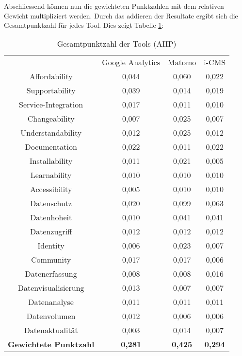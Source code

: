       \newpage
      Abschliessend können nun die gewichteten Punktzahlen mit dem relativen Gewicht multipliziert werden. Durch das addieren der Resultate ergibt sich die Gesamtpunktzahl für jedes Tool. Dies zeigt Tabelle \ref{tab:gewPunkt}:
      \begin{table}[h]
        \centering
        \begin{tabular}{cccc}
          & Google Analytics & Matomo & i-CMS \\
          Affordability & 0,044 & 0,060 & 0,022 \\
          Supportability & 0,039 & 0,014 & 0,019 \\
          Service-Integration & 0,017 & 0,011 & 0,010 \\
          Changeability & 0,007 & 0,025 & 0,007 \\
          Understandability & 0,012 & 0,025 & 0,012 \\
          Documentation & 0,022 & 0,011 & 0,022 \\
          Installability & 0,011 & 0,021 & 0,005 \\
          Learnability & 0,010 & 0,010 & 0,010 \\
          Accessibility & 0,005 & 0,010 & 0,010 \\
          Datenschutz & 0,020 & 0,099 & 0,063 \\
          Datenhoheit & 0,010 & 0,041 & 0,041 \\
          Datenzugriff & 0,012 & 0,012 & 0,012 \\
          Identity & 0,006 & 0,023 & 0,007 \\
          Community & 0,017 & 0,017 & 0,006 \\
          Datenerfassung & 0,008 & 0,008 & 0,016 \\
          Datenvisualisierung & 0,013 & 0,007 & 0,007 \\
          Datenanalyse & 0,011 & 0,011 & 0,011 \\
          Datenvolumen & 0,012 & 0,006 & 0,006 \\
          Datenaktualität & 0,003 & 0,014 & 0,007 \\
          \textbf{Gewichtete Punktzahl} & \textbf{0,281} & \textbf{0,425} & \textbf{0,294} \\
          \end{tabular} 
        \caption{Gesamtpunktzahl der Tools (AHP)}
        \label{tab:gewPunkt}
        \end{table}


